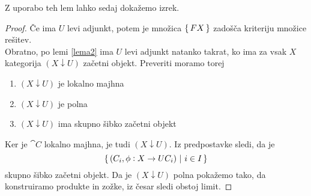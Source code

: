 Z uporabo teh lem lahko sedaj dokažemo izrek.
\begin{proof}
Če ima $U$ levi adjunkt, potem je množica $\{\,FX\,\}$ zadošča kriteriju množice rešitev.\\
Obratno, po lemi \ref{lema2} ima $U$ levi adjunkt natanko takrat, ko ima za vsak $X$ kategorija $(X \downarrow U)$ začetni objekt. Preveriti moramo torej
\begin{enumerate}
\item $(X \downarrow U)$ je lokalno majhna
\item $(X \downarrow U)$ je polna 
\item $(X \downarrow U)$ ima skupno šibko začetni objekt
\end{enumerate}
Ker je $\cat{C}$ lokalno majhna, je tudi $(X \downarrow U)$. Iz predpostavke sledi, da je
$$\{\,(C_i, \phi : X \to UC_i) \ \vert \ i \in I\,\}$$
skupno šibko začetni objekt. Da je $(X \downarrow U)$ polna pokažemo tako, da konstruiramo produkte in zožke, iz česar sledi obstoj limit. 
\end{proof}
%